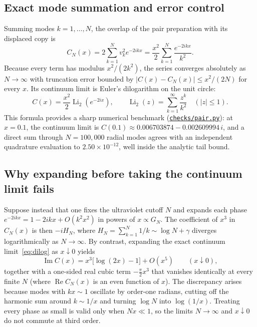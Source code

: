 \documentclass[10pt,a4paper]{article}
\newcommand{\repo}[2]{\href{https://github.com/sprajs/quantum-gravity/blob/main/#1}{#2}}
\begin{document}
\subsection{Exact mode summation and error control}
Summing modes $k = 1, \ldots, N$, the overlap of the pair preparation with its displaced copy is
\begin{equation}
  C_N(x)
  = 2\sum_{k=1}^N v_k^2 e^{-2ikx}
  = \frac{x^2}{2}\sum_{k=1}^N \frac{e^{-2ikx}}{k^2}.
  \label{eq:dilog-partial}
\end{equation}
Because every term has modulus $x^2/(2k^2)$, the series converges absolutely as $N \to \infty$ with truncation error bounded by $|C(x) - C_N(x)| \le x^2/(2N)$ for every $x$. Its continuum limit is Euler's dilogarithm on the unit circle:
\begin{equation}
  C(x) = \frac{x^2}{2}\operatorname{Li}_2(e^{-2ix}),
  \qquad
  \operatorname{Li}_2(z) = \sum_{k=1}^{\infty}\frac{z^k}{k^2}
  \quad (|z|\le 1).
  \label{eq:dilog}
\end{equation}
This formula provides a sharp numerical benchmark (\repo{checks/pair.py}{\texttt{checks/pair.py}}): at $x = 0.1$, the continuum limit is $C(0.1) \approx 0.006703874 - 0.002609994\,i$, and a direct sum through $N = 100{,}000$ radial modes agrees with an independent quadrature evaluation to $2.50\times 10^{-12}$, well inside the analytic tail bound.

\subsection{Why expanding before taking the continuum limit fails}
Suppose instead that one fixes the ultraviolet cutoff $N$ and expands each phase $e^{-2ikx} = 1 - 2ikx + O(k^2x^2)$ in powers of $x \propto G_N$. The coefficient of $x^3$ in $C_N(x)$ is then $-iH_N$, where $H_N = \sum_{k=1}^N 1/k \sim \log N + \gamma$ diverges logarithmically as $N \to \infty$. By contrast, expanding the exact continuum limit~\eqref{eq:dilog} as $x \downarrow 0$ yields
\begin{equation}
  \operatorname{Im} C(x) = x^3\bigl[\log(2x) - 1\bigr] + O(x^5)
  \qquad (x \downarrow 0),
\end{equation}
together with a one-sided real cubic term $-\frac{\pi}{2}x^3$ that vanishes identically at every finite $N$ (where $\operatorname{Re}C_N(x)$ is an even function of $x$). The discrepancy arises because modes with $kx \sim 1$ oscillate by order-one radians, cutting off the harmonic sum around $k \sim 1/x$ and turning $\log N$ into $\log(1/x)$. Treating every phase as small is valid only when $Nx \ll 1$, so the limits $N \to \infty$ and $x \downarrow 0$ do not commute at third order.
\end{document}
